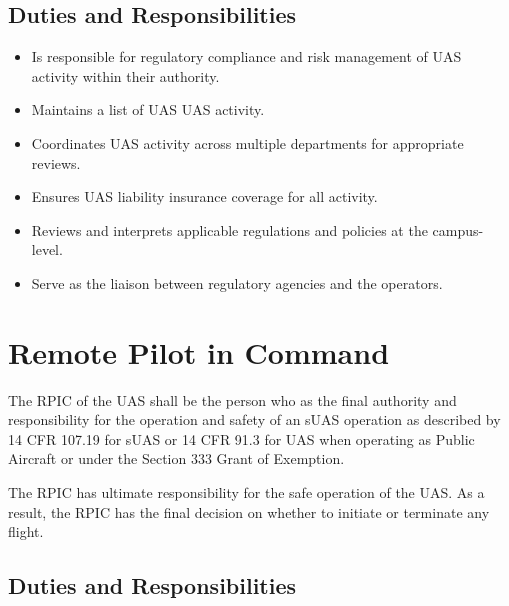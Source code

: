 \documentclass[
]{book}
\providecommand{\tightlist}{%
  \setlength{\itemsep}{0pt}\setlength{\parskip}{0pt}}
\begin{document}
\hypertarget{duties-and-responsibilities-1}{%
\subsection{Duties and Responsibilities}\label{duties-and-responsibilities-1}}

\begin{itemize}
\tightlist
\item
  Is responsible for regulatory compliance and risk management of UAS activity within their authority.
\item
  Maintains a list of UAS UAS activity.
\item
  Coordinates UAS activity across multiple departments for appropriate reviews.
\item
  Ensures UAS liability insurance coverage for all activity.
\item
  Reviews and interprets applicable regulations and policies at the campus-level.
\item
  Serve as the liaison between regulatory agencies and the operators.
\end{itemize}

\hypertarget{remote-pilot-in-command}{%
\section{Remote Pilot in Command}\label{remote-pilot-in-command}}

The RPIC of the UAS shall be the person who as the final authority and responsibility for the operation and safety of an sUAS operation as described by 14 CFR 107.19 for sUAS or 14 CFR 91.3 for UAS when operating as Public Aircraft or under the Section 333 Grant of Exemption.

The RPIC has ultimate responsibility for the safe operation of the UAS. As a result, the RPIC has the final decision on whether to initiate or terminate any flight.

\hypertarget{duties-and-responsibilities-2}{%
\subsection{Duties and Responsibilities}\label{duties-and-responsibilities-2}}
\end{document}
